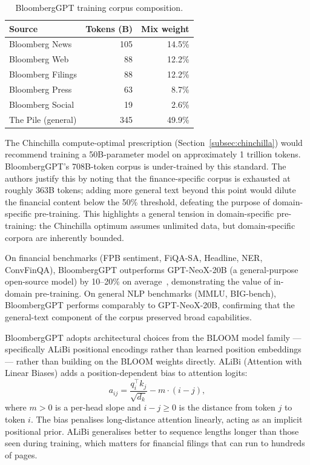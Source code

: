 \begin{context}
\begin{table}[H]
  \centering
  \caption{BloombergGPT training corpus composition.}
  \label{tab:bloomberggpt-corpus}
  \begin{tabular}{lrr}
    \toprule
    Source & Tokens (B) & Mix weight \\
    \midrule
    Bloomberg News     & 105 & 14.5\% \\
    Bloomberg Web      &  88 & 12.2\% \\
    Bloomberg Filings  &  88 & 12.2\% \\
    Bloomberg Press    &  63 &  8.7\% \\
    Bloomberg Social   &  19 &  2.6\% \\
    The Pile (general) & 345 & 49.9\% \\
    \bottomrule
  \end{tabular}
\end{table}

The Chinchilla compute-optimal prescription (Section~\ref{subsec:chinchilla})
would recommend training a 50B-parameter model on approximately 1 trillion tokens.
BloombergGPT's 708B-token corpus is under-trained by this standard.  The authors
justify this by noting that the finance-specific corpus is exhausted at roughly
363B tokens; adding more general text beyond this point would dilute the financial
content below the 50\% threshold, defeating the purpose of domain-specific
pre-training.  This highlights a general tension in domain-specific pre-training:
the Chinchilla optimum assumes unlimited data, but domain-specific corpora are
inherently bounded.

On financial benchmarks (FPB sentiment, FiQA-SA, Headline, NER, ConvFinQA),
BloombergGPT outperforms GPT-NeoX-20B (a general-purpose open-source model)
by 10--20\% on average~\citep{wu2023bloomberggpt}, demonstrating the value of in-domain pre-training.
On general NLP benchmarks (MMLU, BIG-bench), BloombergGPT performs comparably
to GPT-NeoX-20B, confirming that the general-text component of the corpus
preserved broad capabilities.

BloombergGPT adopts architectural choices from the BLOOM model family --- specifically
ALiBi positional encodings rather than learned position embeddings --- rather than
building on the BLOOM weights directly.
ALiBi (Attention with Linear Biases) adds a position-dependent bias to attention
logits:
\begin{equation}
  a_{ij} = \frac{q_i^\top k_j}{\sqrt{d_k}} - m \cdot (i - j),
  \label{eq:alibi}
\end{equation}
where $m > 0$ is a per-head slope and $i - j \geq 0$ is the distance from
token $j$ to token $i$.  The bias penalises long-distance attention linearly,
acting as an implicit positional prior.  ALiBi generalises better to
sequence lengths longer than those seen during training, which matters for
financial filings that can run to hundreds of pages.


\end{context}
